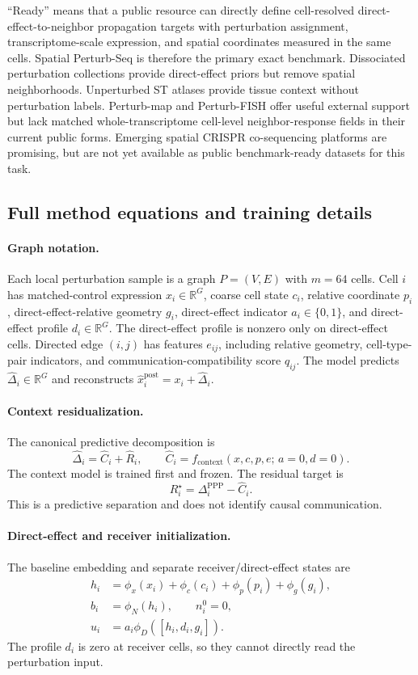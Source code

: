 \documentclass[sigconf,review,balance=false]{acmart}
\begin{document}
``Ready'' means that a public resource can directly define cell-resolved direct-effect-to-neighbor propagation targets with perturbation assignment, transcriptome-scale expression, and spatial coordinates measured in the same cells. Spatial Perturb-Seq is therefore the primary exact benchmark. Dissociated perturbation collections provide direct-effect priors but remove spatial neighborhoods. Unperturbed ST atlases provide tissue context without perturbation labels. Perturb-map and Perturb-FISH offer useful external support but lack matched whole-transcriptome cell-level neighbor-response fields in their current public forms. Emerging spatial CRISPR co-sequencing platforms are promising, but are not yet available as public benchmark-ready datasets for this task.

\subsection{Full method equations and training details}
\label{app:method_full_details}

\paragraph{Graph notation.}
Each local perturbation sample is a graph $P=(V,E)$ with $m=64$ cells. Cell $i$ has matched-control expression $x_i\in\mathbb R^G$, coarse cell state $c_i$, relative coordinate $p_i$, direct-effect-relative geometry $g_i$, direct-effect indicator $a_i\in\{0,1\}$, and direct-effect profile $d_i\in\mathbb R^G$. The direct-effect profile is nonzero only on direct-effect cells. Directed edge $(i,j)$ has features $e_{ij}$, including relative geometry, cell-type-pair indicators, and communication-compatibility score $q_{ij}$. The model predicts $\widehat\Delta_i\in\mathbb R^G$ and reconstructs $\widehat x_i^{\mathrm{post}}=x_i+\widehat\Delta_i$.

\paragraph{Context residualization.}
The canonical predictive decomposition is
\[
\widehat\Delta_i=\widehat C_i+\widehat R_i,\qquad
\widehat C_i=f_{\mathrm{context}}(x,c,p,e;\,a=0,d=0).
\]
The context model is trained first and frozen. The residual target is
\[
R_i^\star=\Delta_i^{\mathrm{PPP}}-\widehat C_i .
\]
This is a predictive separation and does not identify causal communication.

\paragraph{Direct-effect and receiver initialization.}
The baseline embedding and separate receiver/direct-effect states are
\[
\begin{aligned}
h_i&=\phi_x(x_i)+\phi_c(c_i)+\phi_p(p_i)+\phi_g(g_i),\\
b_i&=\phi_N(h_i),\qquad n_i^0=0,\\
u_i&=a_i\phi_D([h_i,d_i,g_i]).
\end{aligned}
\]
The profile $d_i$ is zero at receiver cells, so they cannot directly read the
perturbation input.
\end{document}

